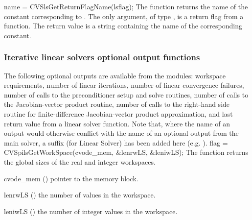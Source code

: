 {
}
{
  name = CVSlsGetReturnFlagName(lsflag);
}
{
  The function  returns the
  name of the {\cvsls} constant corresponding to .
}
{
  The only argument, of type , is a return flag from a {\cvsls}
  function.
}
{
  The return value is a string containing the name of the corresponding constant.
}
{}


\subsubsection{Iterative linear solvers optional output functions}
\label{sss:optout_spils}
The following optional outputs are available from the {\cvspils}
modules: workspace requirements, number of linear iterations, number of
linear convergence failures, number of calls to the preconditioner
setup and solve routines, number of calls to the Jacobian-vector
product routine, number of calls to the right-hand side routine for
finite-difference Jacobian-vector product approximation, and last
return value from a linear solver function.
Note that, where the name of an output would otherwise conflict with
the name of an optional output from the main solver, a suffix 
(for Linear Solver) has been added here (e.g.  ).
{
  flag = CVSpilsGetWorkSpace(cvode\_mem, \&lenrwLS, \&leniwLS);
}
{
  The function  returns the global sizes of the
  {\cvspils} real and integer workspaces.
}
{
  \begin{args}
  \item[cvode\_mem] ()
    pointer to the {\cvodes} memory block.
  \item[lenrwLS] ()
    the number of  values in the {\cvspils} workspace.
  \item[leniwLS] ()
    the number of integer values in the {\cvspils} workspace.
  \end{args}
}
